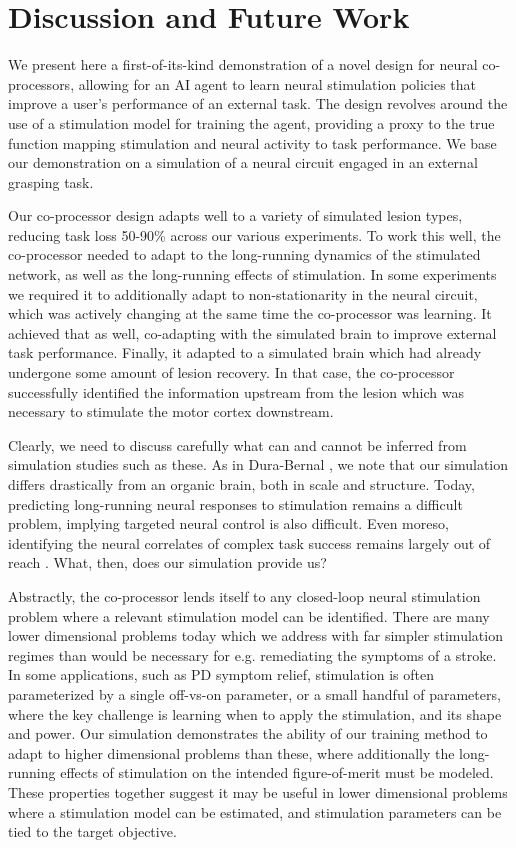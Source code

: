 \documentclass[12pt]{iopart}
\begin{document}
\section{Discussion and Future Work}
\label{sec:discussion}

We present here a first-of-its-kind demonstration of a novel design for neural co-processors,
allowing for an AI agent to learn neural stimulation policies that improve a user's performance
of an external task. The design revolves around the use of a stimulation model for training the
agent, providing a proxy to the true function mapping stimulation and neural activity
to task performance. We base our demonstration on a simulation of a neural circuit engaged in
an external grasping task.

Our co-processor design adapts well to a variety of simulated lesion types, reducing task loss
50-90\% across our various experiments. To work this well, the co-processor needed to adapt to
the long-running dynamics of the stimulated network, as well as the long-running effects of
stimulation. In some experiments we required it to additionally adapt to non-stationarity in
the neural circuit, which was actively changing at the same time the co-processor was learning.
It achieved that as well, co-adapting with the simulated brain to improve external task
performance. Finally, it adapted to a simulated brain which had already undergone some amount of
lesion recovery. In that case, the co-processor successfully identified the information upstream
from the lesion which was necessary to stimulate the motor cortex downstream.

Clearly, we need to discuss carefully what can and cannot be inferred from simulation studies
such as these. As in Dura-Bernal \cite{bernal.sim}, we note that our simulation differs
drastically from an organic brain, both in scale and structure. Today, predicting long-running
neural responses to stimulation remains a difficult problem, implying targeted neural control
is also difficult. Even moreso, identifying the neural correlates of complex task success
remains largely out of reach \cite{khanna.openloop}. What, then, does our simulation provide us?

Abstractly, the co-processor lends itself to any closed-loop neural stimulation problem
where a relevant stimulation model can be identified. There are many lower dimensional problems
today which we address with far simpler stimulation regimes than would be necessary for
e.g. remediating the symptoms of a stroke. In some applications, such as PD symptom relief,
stimulation is often parameterized by a single off-vs-on parameter, or a small handful of
parameters, where the key challenge is learning when to apply the stimulation, and
its shape and power. Our simulation demonstrates the ability of our training method to adapt to
higher dimensional problems than these, where additionally the long-running effects of
stimulation on the intended figure-of-merit must be modeled. These properties together
suggest it may be useful in lower dimensional problems where a stimulation model can be
estimated, and stimulation parameters can be tied to the target objective.
\end{document}
